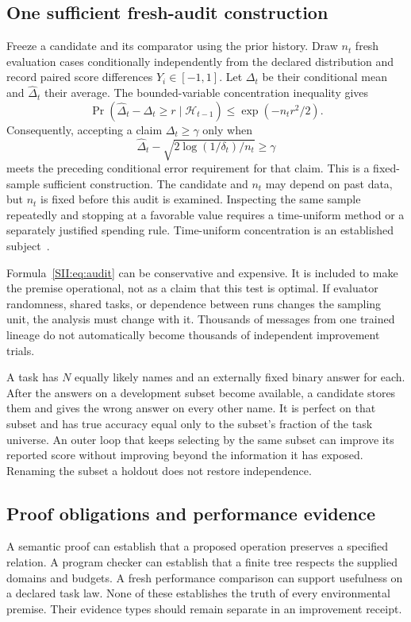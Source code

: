 \subsection{One sufficient fresh-audit construction}
Freeze a candidate and its comparator using the prior history. Draw $n_t$ fresh evaluation cases conditionally independently from the declared distribution and record paired score differences $Y_i\in[-1,1]$. Let $\Delta_t$ be their conditional mean and $\widehat\Delta_t$ their average. The bounded-variable concentration inequality gives
\[
\Pr\left(\widehat\Delta_t-\Delta_t\geq r\mid\mathcal H_{t-1}\right)
\leq \exp(-n_tr^2/2).
\]
Consequently, accepting a claim $\Delta_t\geq\gamma$ only when
\begin{equation}\label{SII:eq:audit}
\widehat\Delta_t-\sqrt{2\log(1/\delta_t)/n_t}\geq\gamma
\end{equation}
meets the preceding conditional error requirement for that claim. This is a fixed-sample sufficient construction. The candidate and $n_t$ may depend on past data, but $n_t$ is fixed before this audit is examined. Inspecting the same sample repeatedly and stopping at a favorable value requires a time-uniform method or a separately justified spending rule. Time-uniform concentration is an established subject~\cite{SII:howard}.

Formula~\eqref{SII:eq:audit} can be conservative and expensive. It is included to make the premise operational, not as a claim that this test is optimal. If evaluator randomness, shared tasks, or dependence between runs changes the sampling unit, the analysis must change with it. Thousands of messages from one trained lineage do not automatically become thousands of independent improvement trials.

\begin{SIIcounterexample}\label{SII:ex:reuse}
A task has $N$ equally likely names and an externally fixed binary answer for each. After the answers on a development subset become available, a candidate stores them and gives the wrong answer on every other name. It is perfect on that subset and has true accuracy equal only to the subset's fraction of the task universe. An outer loop that keeps selecting by the same subset can improve its reported score without improving beyond the information it has exposed. Renaming the subset a holdout does not restore independence.
\end{SIIcounterexample}

\subsection{Proof obligations and performance evidence}
A semantic proof can establish that a proposed operation preserves a specified relation. A program checker can establish that a finite tree respects the supplied domains and budgets. A fresh performance comparison can support usefulness on a declared task law. None of these establishes the truth of every environmental premise. Their evidence types should remain separate in an improvement receipt.

